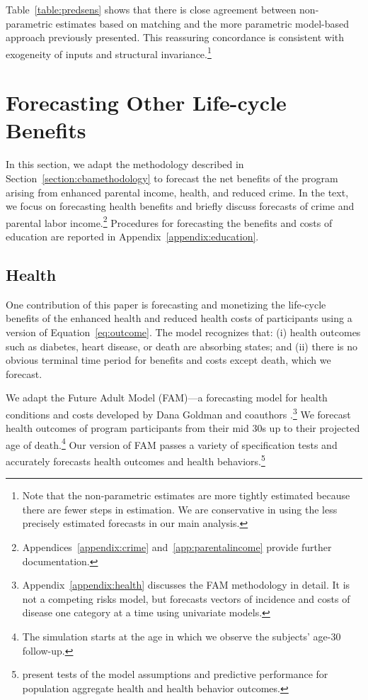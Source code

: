 Table~\ref{table:predsens} shows that there is close agreement between non-parametric estimates based on matching and the more parametric model-based approach previously presented. This reassuring concordance is consistent with exogeneity of inputs and structural invariance.\footnote{Note that the non-parametric estimates are more tightly estimated because there are fewer steps in estimation. We are conservative in using the less precisely estimated forecasts in our main analysis.}

\section{Forecasting Other Life-cycle Benefits} \label{section:cbapractice}

\noindent In this section, we adapt the methodology described in Section~\ref{section:cbamethodology} to forecast the net benefits of the program arising from enhanced parental income, health, and reduced crime. In the text, we focus on forecasting health benefits and briefly discuss forecasts of crime and parental labor income.\footnote{Appendices~\ref{appendix:crime} and~\ref{app:parentalincome} provide further documentation.} Procedures for forecasting the benefits and costs of education are reported in Appendix~\ref{appendix:education}.

\subsection{Health}

\noindent One contribution of this paper is forecasting and monetizing the life-cycle benefits of the enhanced health and reduced health costs of participants using a version of Equation~\eqref{eq:outcome}. The model recognizes that: (i) health outcomes such as diabetes, heart disease, or death are absorbing states; and (ii) there is no obvious terminal time period for benefits and costs except death, which we forecast.

We adapt the Future Adult Model (FAM)---a forecasting model for health conditions and costs developed by Dana Goldman and coauthors \citep{Goldman_etal_2015_Future-Elderly-Model-Report}.\footnote{Appendix~\ref{appendix:health} discusses the FAM methodology in detail. It is not a competing risks model, but forecasts vectors of incidence and costs of disease one category at a time using univariate models.} We forecast health outcomes of program participants from their mid 30s up to their projected age of death.\footnote{The simulation starts at the age in which we observe the subjects' age-30 follow-up.} Our version of FAM passes a variety of specification tests and accurately forecasts health outcomes and health behaviors.\footnote{\citet{Goldman_etal_2015_Future-Elderly-Model-Report} present tests of the model assumptions and predictive performance for population aggregate health and health behavior outcomes.}

